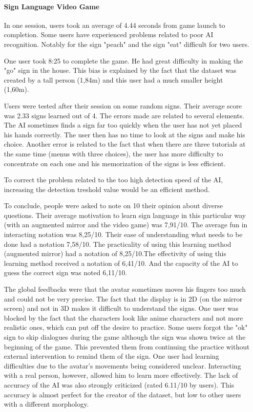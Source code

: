 \paragraph{Sign Language Video Game}

In one session, users took an average of 4.44 seconds from game launch to completion. Some users have experienced problems related to poor AI recognition.
Notably for the sign "peach" and the sign "eat" difficult for two users.

One user took 8:25 to complete the game. He had great difficulty in making the "go" sign in the house. This bias is explained by the fact that the dataset was created by a tall person (1,84m) and this user had a much smaller height (1,60m). 

Users were tested after their session on some random signs. Their average score was 2.33 signs learned out of 4. The errors made are related to several elements. The AI sometimes finds a sign far too quickly when the user has not yet placed his hands correctly. The user then has no time to look at the signs and make his choice. Another error is related to the fact that when there are three tutorials at the same time (menus with three choices), the user has more difficulty to concentrate on each one and his memorization of the signs is less efficient.

To correct the problem related to the too high detection speed of the AI, increasing the detection treshold value would be an efficient method.

To conclude, people were asked to note on 10 their opinion about diverse questions. Their average motivation to learn sign language in this particular way (with an augmented mirror and the video game) was 7,91/10.
The average fun in interacting notation was 8,25/10. Their ease of understanding what needs to be done had a notation 7,58/10. The practicality of using this learning method (augmented mirror) had a notation of 8,25/10.The effectivity of using this learning method received a notation of 6,41/10. And the capacity of the AI to guess the correct sign was noted 6,11/10.

The global feedbacks were that the avatar sometimes moves his fingers too much and could not be very precise. The fact that the display is in 2D (on the mirror screen) and not in 3D makes it difficult to understand the signs.
One user was blocked by the fact that the characters look like anime characters and not more realistic ones, which can put off the desire to practice.
Some users forgot the "ok" sign to skip dialogues during the game although the sign was shown twice at the beginning of the game. This prevented them from continuing the practice without external intervention to remind them of the sign. 
One user had learning difficulties due to the avatar's movements being considered unclear. Interacting with a real person, however, allowed him to learn more effectively. The lack of accuracy of the AI was also strongly criticized (rated 6.11/10 by users). This accuracy is almost perfect for the creator of the dataset, but low to other users with a different morphology.


